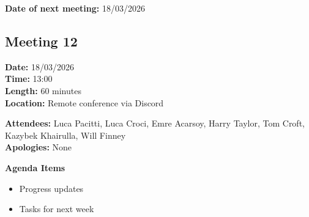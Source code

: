 \documentclass[11pt]{article}
\begin{document}
    \textbf{Date of next meeting:} 18/03/2026

    \vspace{1.5\baselineskip}
    \subsection{Meeting 12}

    \textbf{Date:} 18/03/2026 \\
    \textbf{Time:} 13:00 \\
    \textbf{Length:} 60 minutes \\
    \textbf{Location:} Remote conference via Discord

    \textbf{Attendees:} Luca Pacitti, Luca Croci, Emre Acarsoy, Harry Taylor, Tom Croft, Kazybek Khairulla, Will Finney \\
    \textbf{Apologies:} None

    \textbf{Agenda Items}
    \begin{itemize}
        \item Progress updates
        \item Tasks for next week
    \end{itemize}
\end{document}
